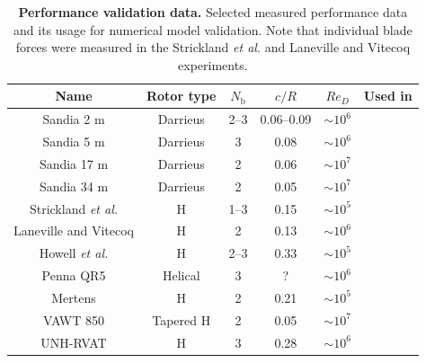 \documentclass[10pt,letterpaper]{article}
\begin{document}

\begin{table}
    \centering
    
    \begin{tabular}{c|c|c|c|c|c}
        Name & Rotor type & $N_\mathrm{b}$ & $c/R$ & $Re_D$ & Used in \\ 
        \hline
        Sandia 2 m \cite{Blackwell1976} &  Darrieus  & 2--3 & 0.06--0.09 & $\sim 10^6$ & \cite{Roh2013,Bedon2014} \\ 
        Sandia 5 m \cite{Sheldahl1977} &  Darrieus  & 3 & 0.08 & $\sim 10^6$ & \cite{Antheaume2008,Bedon2014} \\ 
        Sandia 17 m \cite{Worstell1978} & Darrieus  & 2 & 0.06 & $\sim 10^7$ & \cite{Para1988,Orlandi2015,Bedon2014} \\ 
        Sandia 34 m \cite{Ashwill1992} & Darrieus  & 2 & 0.05 & $\sim 10^7$ & \cite{Liu1992,Murray2011,Bedon2014}  \\ 
        Strickland \emph{et al.} \cite{Strickland1981} & H & 1--3 & 0.15 & $\sim 10^5$ & \cite{Ponta2001,Scheurich2011b} \\ 
        Laneville and Vitecoq \cite{Laneville1986} & H & 2 & 0.13 & $\sim 10^6$ & \cite{Amet2009} \\ 
        Howell \emph{et al.} \cite{Howell2010} & H & 2--3 & 0.33 & $\sim 10^5$ & \cite{Joo2015} \\ 
        Penna QR5 \cite{Penna2008} & Helical & 3 & ? & $\sim 10^6$ & \cite{Scheurich2011} \\ 
        Mertens \cite{Mertens2003} & H & 2 & 0.21 & $\sim 10^5$ & \cite{Orlandi2015} \\ 
        VAWT 850 \cite{Mays1990} & Tapered H & 2 & 0.05 & $\sim 10^7$ & \cite{Murray2011} \\ 
        UNH-RVAT \cite{Bachant2014-RVAT-baseline} & H & 3 & 0.28 & $\sim 10^6$ & \cite{Michelen2014}
    \end{tabular}     

    \caption{\textbf{Performance validation data.} Selected measured performance
        data and its usage for numerical model validation. Note that individual
        blade forces were measured in the Strickland \emph{et al.} and Laneville and
        Vitecoq experiments.}

    \label{tab:validation-data}
\end{table}
\end{document}

